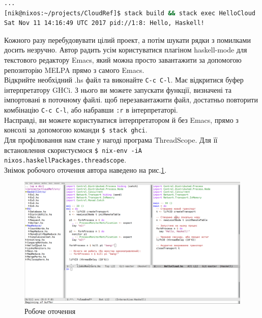 \documentclass[12pt]{article}
\begin{document}
\begin{lstlisting}[language=bash, caption={Будування та запуск HelloCloud.hs}]
...
[nik@nixos:~/projects/CloudRef]$ stack build && stack exec HelloCloud
Sat Nov 11 14:16:49 UTC 2017 pid://1:8: Hello, Haskell!
\end{lstlisting}

Кожного разу перебудовувати цілий проект, а потім шукати рядки з помилками досить незручно. Автор радить 
усім користуватися плагіном haskell-mode\cite{haskellModeManual} для текстового редактору Emacs\cite{emacs}, 
який можна просто завантажити за допомогою репозиторію MELPA прямо з самого Emacs\cite{haskellModeInstall}. \\

Відкрийте необхідний .hs файл та виконайте \texttt{С-с С-l}. Має відкритися буфер інтерпретатору 
GHCi\cite{ghci}. З нього ви можете запускати функції, визначені та імпортовані в поточному файлі. щоб 
перезавантажити файл, достатньо повторити комбінацію \texttt{С-с С-l}, або набравши \texttt{:r} в інтерпретаторі. \\

Насправді, ви можете користуватися інтерпретатором й без Emacs, прямо з консолі за допомогою 
команди \lstinline{$ stack ghci}. \\

Для профілювання нам стане у нагоді програма ThreadScope. Для її встановлення скористуємося 
\lstinline{$ nix-env -iA nixos.haskellPackages.threadscope}.\\

Знімок робочого оточення автора наведено на рис.\ref{emacs}.\\

\begin{figure}[H]
  \includegraphics[width=\linewidth]{emacs1.png}
  \centering
  \caption{Робоче оточення}
  \label{emacs}
\end{figure}
\end{document}
